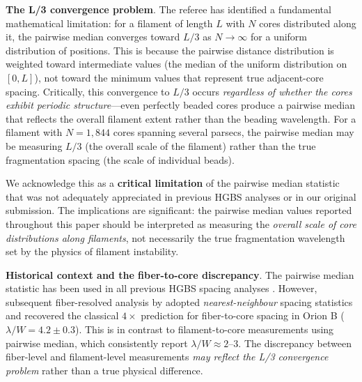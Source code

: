 \documentclass[twoside,twocolumn]{mnras}
\begin{document}
\textbf{The L/3 convergence problem}. The referee has identified a fundamental mathematical limitation: for a filament of length $L$ with $N$ cores distributed along it, the pairwise median converges toward $L/3$ as $N \to \infty$ for a uniform distribution of positions. This is because the pairwise distance distribution is weighted toward intermediate values (the median of the uniform distribution on $[0, L]$), not toward the minimum values that represent true adjacent-core spacing. Critically, this convergence to $L/3$ occurs \textit{regardless of whether the cores exhibit periodic structure}—even perfectly beaded cores produce a pairwise median that reflects the overall filament extent rather than the beading wavelength. For a filament with $N = 1,844$ cores spanning several parsecs, the pairwise median may be measuring $L/3$ (the overall scale of the filament) rather than the true fragmentation spacing (the scale of individual beads).

We acknowledge this as a \textbf{critical limitation} of the pairwise median statistic that was not adequately appreciated in previous HGBS analyses or in our original submission. The implications are significant: the pairwise median values reported throughout this paper should be interpreted as measuring the \textit{overall scale of core distributions along filaments}, not necessarily the true fragmentation wavelength set by the physics of filament instability.

\textbf{Historical context and the fiber-to-core discrepancy}. The pairwise median statistic has been used in all previous HGBS spacing analyses \citep{Arzoumanian2011, Arzoumanian2019}. However, subsequent fiber-resolved analysis by \citet{Hacar2013, Hacar2018} adopted \textit{nearest-neighbour} spacing statistics and recovered the classical $4\times$ prediction for fiber-to-core spacing in Orion B ($\lambda/W = 4.2 \pm 0.3$). This is in contrast to filament-to-core measurements using pairwise median, which consistently report $\lambda/W \approx 2$--$3$. The discrepancy between fiber-level and filament-level measurements \textit{may reflect the L/3 convergence problem} rather than a true physical difference.
\end{document}
